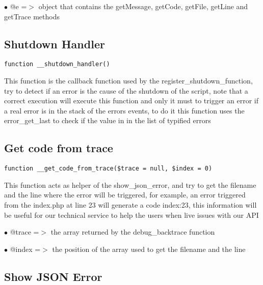 \documentclass[a4paper]{book}
\begin{document}
\begin{compactitem}
\item[\color{myblue}$\bullet$] @e =$>$ object that contains the getMessage, getCode, getFile, getLine and getTrace
      methods
\end{compactitem}

\hypertarget{toc110}{}
\subsection{Shutdown Handler}

\begin{lstlisting}
function __shutdown_handler()
\end{lstlisting}

This function is the callback function used by the register\_shutdown\_function, try to
detect if an error is the cause of the shutdown of the script, note that a correct
execution will execute this function and only it must to trigger an error if a real
error is in the stack of the errors events, to do it this function uses the error\_get\_last
to check if the value in in the list of typified errors

\hypertarget{toc111}{}
\subsection{Get code from trace}

\begin{lstlisting}
function __get_code_from_trace($trace = null, $index = 0)
\end{lstlisting}

This function acts as helper of the show\_json\_error, and try to get the filename and the line
where the error will be triggered, for example, an error triggered from the index.php at line
23 will generate a code index:23, this information will be useful for our technical service
to help the users when live issues with our API

\begin{compactitem}
\item[\color{myblue}$\bullet$] @trace =$>$ the array returned by the debug\_backtrace function
\item[\color{myblue}$\bullet$] @index =$>$ the position of the array used to get the filename and the line
\end{compactitem}

\hypertarget{toc112}{}
\subsection{Show JSON Error}
\end{document}
